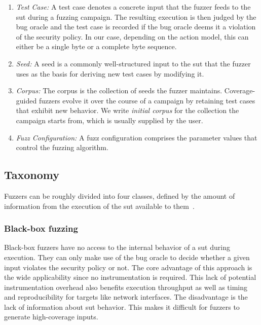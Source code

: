 \begin{enumerate}
  \item \emph{Test Case:}
    A test case denotes a concrete input that the fuzzer feeds to the \gls{sut} during
    a fuzzing campaign. The resulting execution is then judged by the bug oracle
    and the test case is recorded if the bug oracle deems it a violation of the
    security policy.
    In our case, depending on the action model, this can either be a single byte or a 
    complete byte sequence.

  \item \emph{Seed:}
    A seed is a commonly well-structured input to the \gls{sut} that the fuzzer uses
    as the basis for deriving new test cases by modifying it.

  \item \emph{Corpus:}
    The corpus is the collection of seeds the fuzzer maintains. Coverage-guided
    fuzzers evolve it over the course of a campaign by retaining test cases that
    exhibit new behavior. We write \emph{initial corpus} for the collection the
    campaign starts from, which is usually supplied by the user.

  \item \emph{Fuzz Configuration:}
    A fuzz configuration comprises the parameter values that control the fuzzing
    algorithm.
\end{enumerate}

\subsection{Taxonomy}\label{sec:fuzzing-taxonomy}

Fuzzers can be roughly divided into four classes, defined by the amount of
information from the execution of the \gls{sut} available to them~\cite{liang_fuzzing_2018}.

\subsubsection{Black-box fuzzing}

Black-box fuzzers have no access to the internal behavior of a \gls{sut} during execution.
They can only make use of the bug oracle to decide whether a given input violates
the security policy or not.
The core advantage of this approach is the wide applicability since no instrumentation
is required.
This lack of potential instrumentation overhead also benefits execution throughput
as well as timing and reproducibility for targets like network interfaces.
The disadvantage is the lack of information about \gls{sut} behavior.
This makes it difficult for fuzzers to generate high-coverage inputs.

